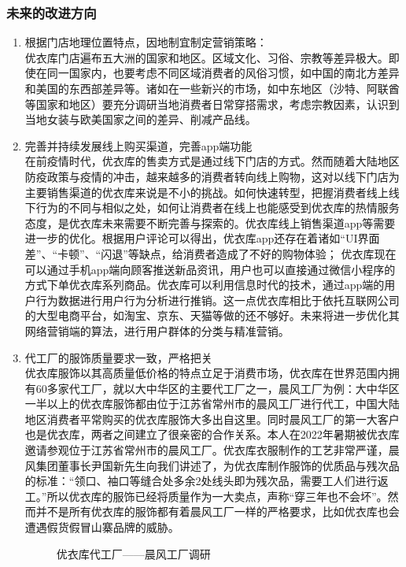\documentclass{xjtureport}
\begin{document}
\subsubsection{未来的改进方向}
\begin{enumerate}
    \item 根据门店地理位置特点，因地制宜制定营销策略：\\
    优衣库门店遍布五大洲的国家和地区。区域文化、习俗、宗教等差异极大。即使在同一国家内，也要考虑不同区域消费者的风俗习惯，如中国的南北方差异和美国的东西部差异等。诸如在一些新兴的市场，如中东地区（沙特、阿联酋等国家和地区）要充分调研当地消费者日常穿搭需求，考虑宗教因素，认识到当地女装与欧美国家之间的差异、削减产品线。
    \item 完善并持续发展线上购买渠道，完善app端功能\\
    在前疫情时代，优衣库的售卖方式是通过线下门店的方式。然而随着大陆地区防疫政策与疫情的冲击，越来越多的消费者转向线上购物，这对以线下门店为主要销售渠道的优衣库来说是不小的挑战。如何快速转型，把握消费者线上线下行为的不同与相似之处，如何让消费者在线上也能感受到优衣库的热情服务态度，是优衣库未来需要不断完善与探索的。优衣库线上销售渠道app等需要进一步的优化。根据用户评论可以得出，优衣库app还存在着诸如“UI界面差”、“卡顿”、“闪退”等缺点，给消费者造成了不好的购物体验；
    优衣库现在可以通过手机app端向顾客推送新品资讯，用户也可以直接通过微信小程序的方式下单优衣库系列商品。优衣库可以利用信息时代的技术，通过app端的用户行为数据进行用户行为分析进行推销。这一点优衣库相比于依托互联网公司的大型电商平台，如淘宝、京东、天猫等做的还不够好。未来将进一步优化其网络营销端的算法，进行用户群体的分类与精准营销。
    \item 代工厂的服饰质量要求一致，严格把关\\
    优衣库服饰以其高质量低价格的特点立足于消费市场，优衣库在世界范围内拥有60多家代工厂\cite{ref6}，就以大中华区的主要代工厂之一，晨风工厂为例：大中华区一半以上的优衣库服饰都由位于江苏省常州市的晨风工厂进行代工，中国大陆地区消费者平常购买的优衣库服饰大多出自这里。同时晨风工厂的第一大客户也是优衣库，两者之间建立了很亲密的合作关系。本人在2022年暑期被优衣库邀请参观位于江苏省常州市的晨风工厂\cite{ref4}。优衣库衣服制作的工艺非常严谨，晨风集团董事长尹国新先生向我们讲述了，为优衣库制作服饰的优质品与残次品的标准：“领口、袖口等缝合处多余2处线头即为残次品，需要工人们进行返工。”所以优衣库的服饰已经将质量作为一大卖点，声称“穿三年也不会坏”。然而并不是所有优衣库的服饰都有着晨风工厂一样的严格要求，比如优衣库也会遭遇假货假冒山寨品牌的威胁。\cite{ref12}
        \begin{figure}[H]
            \centering
            \caption{优衣库代工厂——晨风工厂调研}
        \end{figure}
\end{enumerate}
\end{document}
